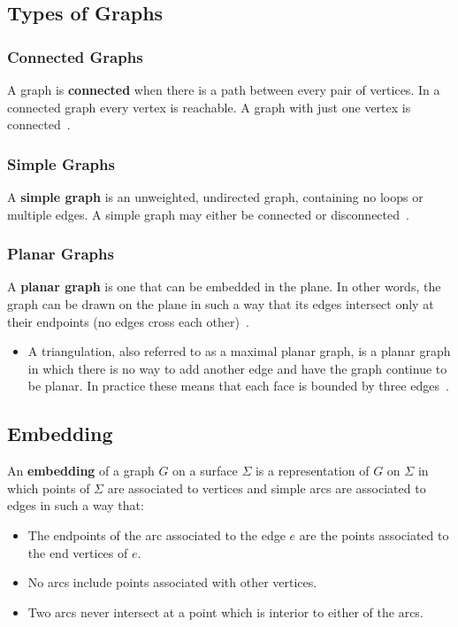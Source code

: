 \documentclass{article}
\begin{document}
 \subsection{Types of Graphs}
 \subsubsection{Connected Graphs}
  A graph is \textbf{connected} when there is a path between every pair of vertices. 
  In a connected graph every vertex is reachable. A graph with just one vertex is connected~\citep{mathworld:ConnectedGraphs}.

 \subsubsection{Simple Graphs}
  A \textbf{simple graph} is an unweighted, undirected graph, containing no loops or multiple edges. 
  A simple graph may either be connected or disconnected~\citep{mathworld:SimpleGraphs}.

  \subsubsection{Planar Graphs}
  A \textbf{planar graph} is one that can be embedded in the plane. 
  In other words, the graph can be drawn on the plane in such a way that its edges intersect only at their endpoints (no edges cross each other)~\citep{mathworld:PlanarGraph}.
  \begin{itemize}
	\item A triangulation, also referred to as a maximal planar graph, is a planar graph in which there is no way to add another edge and have the graph continue to be planar. 
	In practice these means that each face is bounded by three edges~\citep{mathworld:Triangulation}.
  \end{itemize}

 \subsection{Embedding}
  An \textbf{embedding} of a graph $G$ on a surface $\Sigma$ is a representation of $G$ on $\Sigma$ in which points of $\Sigma$ are associated to vertices and simple arcs are associated to edges in such a way that:
  \begin{itemize}
	\item The endpoints of the arc associated to the edge $e$ are the points associated to the end vertices of $e$.
	\item No arcs include points associated with other vertices.
	\item Two arcs never intersect at a point which is interior to either of the arcs.
  \end{itemize}
\end{document}

